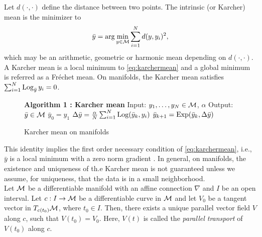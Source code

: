 Let $d(\cdot,\cdot)$ define the distance between two points. The intrinsic (or Karcher) mean is the minimizer to
{\small \begin{equation}
\label{eq:karchermean}
\bar{y} = \arg \min_{y \in \mathcal{M}} \sum_{i=1}^{N} d(y,y_{i})^{2}, 
\end{equation}}
which may be an arithmetic, geometric or harmonic mean depending on $d(\cdot,\cdot)$. A Karcher mean is a local minimum to \eqref{eq:karchermean} and a global minimum is referred as a Fr\'{e}chet mean. On manifolds, the Karcher mean satisfies $\sum_{i=1}^{N} \operatorname*{Log}_{\bar{y}}y_i =0$.

 \begin{figure}[H]
 \begin{center}
 \begin{minipage}{.45\linewidth} 
 \begin{algorithmic}[plain]
 \STATE \textbf{Algorithm 1 : Karcher mean}
 \STATE Input: $y_{1}, \ldots, y_{N} \in \mathcal{M}$, $\alpha$
 \STATE Output: $\bar{y} \in \mathcal{M}$
 \STATE $\bar{y}_{0} = y_{1}$
 \STATE $\Delta\bar{y} = \frac{\alpha}{N} \sum_{i=1}^{N}\operatorname*{Log} (\bar{y}_k,y_i)$
 \STATE $\bar{y}_{k+1} = \operatorname*{Exp}(\bar{y}_k,\Delta \bar{y})$
 \ENDWHILE
  \end{algorithmic}
  \end{minipage}
  \end{center}
 \caption{Karcher mean on manifolds}
     \label{alg:karcher} 
 \end{figure}
 
This identity implies the first order necessary condition of \eqref{eq:karchermean}, i.e., $\bar{y}$ is a local minimum with a zero norm gradient \cite{karcher1977riemannian}. In general, on manifolds, the existence and uniqueness of th.e Karcher mean is not guaranteed unless we assume, for uniqueness, that the data is in a small neighborhood.\\

Let $\mathcal{M}$ be a differentiable manifold with an affine connection $\nabla$ and $I$ be an open interval. Let $c:I \rightarrow \mathcal{M}$ be a differentiable curve in $\mathcal{M}$ and let $V_0$ be a tangent vector in $T_{c(t_0)}\mathcal{M}$, where $t_{0} \in I$. 
Then, there exists a unique parallel vector field $V$ along $c$, such that $V(t_0)=V_0$. Here, $V(t)$ is called the \textit{parallel transport} of $V(t_0)$ along $c$. 

